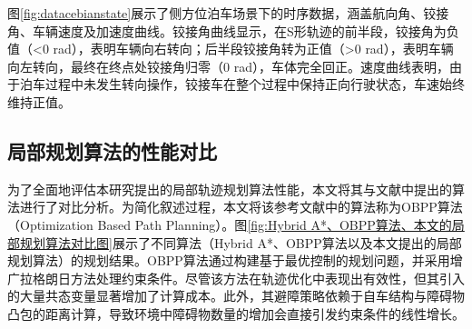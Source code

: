 \documentclass[master,academic]{ysuthesis} %
\begin{document}
		图\ref{fig:datacebianstate}展示了侧方位泊车场景下的时序数据，涵盖航向角、铰接角、车辆速度及加速度曲线。铰接角曲线显示，在S形轨迹的前半段，铰接角为负值（<0 rad），表明车辆向右转向；后半段铰接角转为正值（>0 rad），表明车辆向左转向，最终在终点处铰接角归零（0 rad），车体完全回正。速度曲线表明，由于泊车过程中未发生转向操作，铰接车在整个过程中保持正向行驶状态，车速始终维持正值。

		\subsection{局部规划算法的性能对比}
		为了全面地评估本研究提出的局部轨迹规划算法性能，本文将其与文献\cite{9216948}中提出的算法进行了对比分析。为简化叙述过程，本文将该参考文献中的算法称为OBPP算法（Optimization Based Path Planning）。图\ref{fig:Hybrid A*、OBPP算法、本文的局部规划算法对比图}展示了不同算法（Hybrid A*、OBPP算法以及本文提出的局部规划算法）的规划结果。OBPP算法通过构建基于最优控制的规划问题，并采用增广拉格朗日方法处理约束条件。尽管该方法在轨迹优化中表现出有效性，但其引入的大量共态变量显著增加了计算成本。此外，其避障策略依赖于自车结构与障碍物凸包的距离计算，导致环境中障碍物数量的增加会直接引发约束条件的线性增长。
\end{document}
